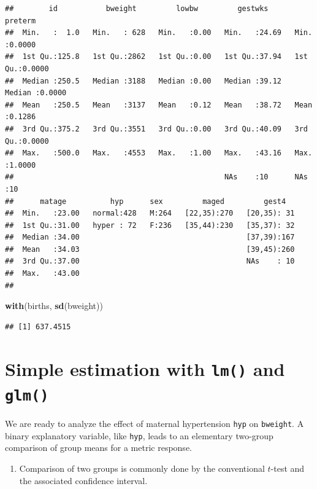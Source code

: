 \documentclass[
]{book}
\newenvironment{Shaded}{\begin{snugshade}}{\end{snugshade}}
\newcommand{\FunctionTok}[1]{\textcolor[rgb]{0.13,0.29,0.53}{\textbf{#1}}}
\newcommand{\NormalTok}[1]{#1}
\providecommand{\tightlist}{%
  \setlength{\itemsep}{0pt}\setlength{\parskip}{0pt}}
\begin{document}
\begin{verbatim}
##        id           bweight         lowbw         gestwks         preterm      
##  Min.   :  1.0   Min.   : 628   Min.   :0.00   Min.   :24.69   Min.   :0.0000  
##  1st Qu.:125.8   1st Qu.:2862   1st Qu.:0.00   1st Qu.:37.94   1st Qu.:0.0000  
##  Median :250.5   Median :3188   Median :0.00   Median :39.12   Median :0.0000  
##  Mean   :250.5   Mean   :3137   Mean   :0.12   Mean   :38.72   Mean   :0.1286  
##  3rd Qu.:375.2   3rd Qu.:3551   3rd Qu.:0.00   3rd Qu.:40.09   3rd Qu.:0.0000  
##  Max.   :500.0   Max.   :4553   Max.   :1.00   Max.   :43.16   Max.   :1.0000  
##                                                NAs    :10      NAs    :10      
##      matage          hyp      sex         maged         gest4    
##  Min.   :23.00   normal:428   M:264   [22,35):270   [20,35): 31  
##  1st Qu.:31.00   hyper : 72   F:236   [35,44):230   [35,37): 32  
##  Median :34.00                                      [37,39):167  
##  Mean   :34.03                                      [39,45):260  
##  3rd Qu.:37.00                                      NAs    : 10  
##  Max.   :43.00                                                   
## 
\end{verbatim}

\begin{Shaded}
\begin{Highlighting}[]
\FunctionTok{with}\NormalTok{(births, }\FunctionTok{sd}\NormalTok{(bweight))}
\end{Highlighting}
\end{Shaded}

\begin{verbatim}
## [1] 637.4515
\end{verbatim}

\section{\texorpdfstring{Simple estimation with \texttt{lm()} and \texttt{glm()}}{Simple estimation with lm() and glm()}}\label{simple-estimation-with-lm-and-glm}

We are ready to analyze the effect of maternal hypertension \texttt{hyp} on \texttt{bweight}.
A binary explanatory variable, like \texttt{hyp}, leads to an elementary
two-group comparison of group
means for a metric response.

\begin{enumerate}
\def\labelenumi{\arabic{enumi}.}
\tightlist
\item
  Comparison of two groups is commonly done by the conventional \(t\)-test and
  the associated confidence interval.
\end{enumerate}
\end{document}
